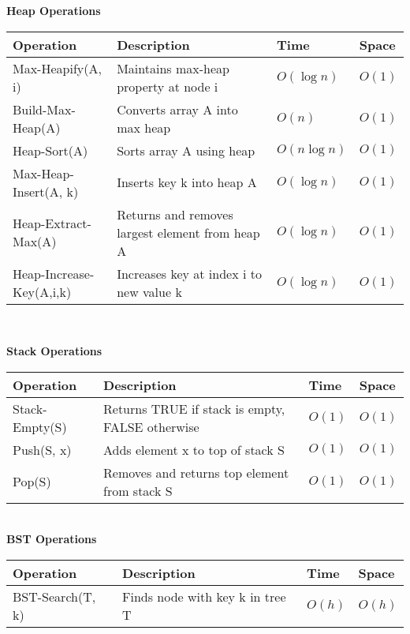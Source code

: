 {{\begin{minipage}[t]{0.49\textwidth}
\textbf{Heap Operations}\\
\begin{tabular}{|p{}|p{}|p{}|p{}|}
\hline
\textbf{Operation} & \textbf{Description} & \textbf{Time} & \textbf{Space} \\
\hline
Max-Heapify(A, i) & Maintains max-heap property at node i & $O(\log n)$ & $O(1)$ \\
\hline
Build-Max-Heap(A) & Converts array A into max heap & $O(n)$ & $O(1)$ \\
\hline
Heap-Sort(A) & Sorts array A using heap & $O(n \log n)$ & $O(1)$ \\
\hline
Max-Heap-Insert(A, k) & Inserts key k into heap A & $O(\log n)$ & $O(1)$ \\
\hline
Heap-Extract-Max(A) & Returns and removes largest element from heap A & $O(\log n)$ & $O(1)$ \\
\hline
Heap-Increase-Key(A,i,k) & Increases key at index i to new value k & $O(\log n)$ & $O(1)$ \\
\hline
\end{tabular}\\
\end{minipage}
\hspace{-37px}
\begin{minipage}[t]{0.49\textwidth}
\textbf{Stack Operations}\\
\begin{tabular}{|p{}|p{}|p{}|p{}|}
\hline
\textbf{Operation} & \textbf{Description} & \textbf{Time} & \textbf{Space} \\
\hline
Stack-Empty(S) & Returns TRUE if stack is empty, FALSE otherwise & $O(1)$ & $O(1)$ \\
\hline
Push(S, x) & Adds element x to top of stack S & $O(1)$ & $O(1)$ \\
\hline
Pop(S) & Removes and returns top element from stack S & $O(1)$ & $O(1)$ \\
\hline
\end{tabular}\\
\textbf{BST Operations}\\
\begin{tabular}{|p{}|p{}|p{}|p{}|}
\hline
\textbf{Operation} & \textbf{Description} & \textbf{Time} & \textbf{Space} \\
\hline
BST-Search(T, k) & Finds node with key k in tree T & $O(h)$ & $O(h)$ \\

\end{tabular}
\end{minipage}}}
